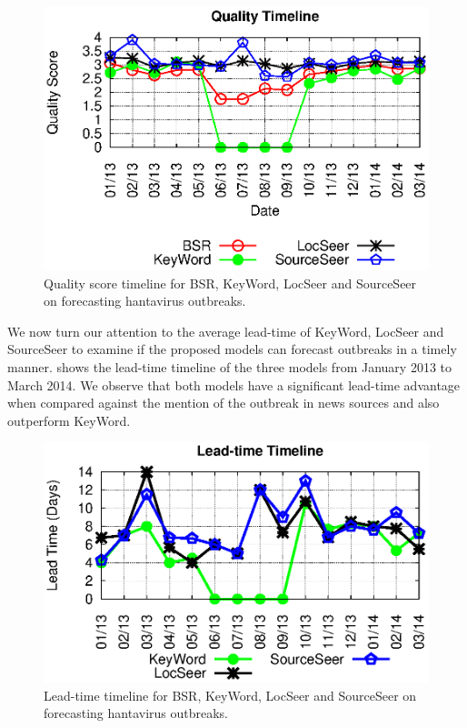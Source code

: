 \documentclass[twoside,leqno,twocolumn]{article}
\newcommand{\fullmodel}{{{\sf SourceSeer}}\xspace}
\newcommand{\locationmodel}{{\sf LocSeer}\xspace}
\newcommand{\keymodel}{{\sf KeyWord}\xspace}
\begin{document}
\begin{figure}[h]
\begin{center}
	\includegraphics[clip,scale=0.63]{fig/quality_timeline.eps}
\end{center}
\caption{Quality score timeline for BSR, \keymodel, \locationmodel and \fullmodel on forecasting hantavirus outbreaks.}
 \label{fig:quality_timeline}
\end{figure}

We now turn our attention to the average lead-time of \keymodel, \locationmodel and \fullmodel to examine if the proposed models can forecast outbreaks in a timely manner.  shows the lead-time timeline of the three models from January 2013 to March 2014. We observe that both models have a significant lead-time advantage when compared against  the mention of the outbreak in news sources and also outperform \keymodel.
\begin{figure}
\begin{center}
	\includegraphics[clip,scale=0.6]{fig/lead_timeline.eps}
\end{center}
\caption{Lead-time timeline for BSR, \keymodel, \locationmodel and \fullmodel on forecasting hantavirus outbreaks.}
 \label{fig:lead_timeline}
\end{figure}
\end{document}
